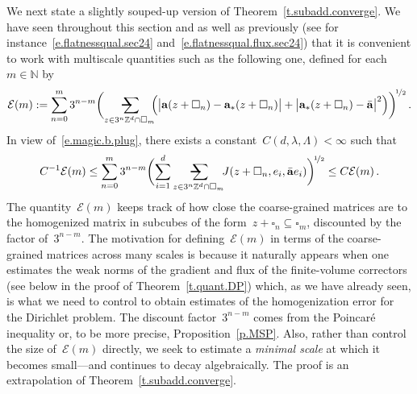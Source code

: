 \documentclass[11pt,twoside]{article} %
\makeatletter
\let\oldsquare\square %
\renewcommand{\square}{\oldsquare}
\numberwithin{equation}{section}
\theoremstyle{definition}
\newcommand*{\N}{\ensuremath{\mathbb{N}}}
\newcommand*{\Zd}{\ensuremath{\mathbb{Z}^d}}
\renewcommand{\a}{\mathbf{a}}
\newcommand{\ahom}{\bar{\a}}
\newcommand{\cu}{\square}
\newcommand{\avsum}{\mathop{\mathpalette\avsuminner\relax}\displaylimits}
\newcommand\avsuminner[2]{%
  {\sbox0{$\m@th#1\sum$}%
   \vphantom{\usebox0}%
   \ooalign{%
     \hidewidth
     \smash{\,\rule[.23em]{8.8pt}{1.1pt} \relax}%
     \hidewidth\cr
   ~$\m@th#1\sum$\cr
   }%
  }%
}
\makeatother
\begin{document}
We next state a slightly souped-up version of Theorem~\ref{t.subadd.converge}. 
We have seen throughout this section and as well as previously (see for instance~\eqref{e.flatnessqual.sec24} and~\eqref{e.flatnessqual.flux.sec24}) that it is convenient to work with multiscale quantities such as the following one, defined for each~$m\in\N$ by 
\begin{equation} 
\label{e.mcE.0}
\mathcal{E}(m) 
:=
\sum_{n=0}^{m}
3^{n-m} 
\biggl( 
\avsum_{z\in 3^n\Zd\cap \cu_m}
\!\!
\Bigl( \bigl| \a(z+\cu_n) - \a_*(z+\cu_n)  \bigr|
+
\bigl| \a_*(z+\cu_n) - \ahom \bigr|^2 \Bigr) 
\biggr)^{\!\nicefrac12} 
\,.
\end{equation}
In view of~\eqref{e.magic.b.plug}, there exists a constant~$C(d,\lambda,\Lambda)<\infty$ such that 
\begin{equation}
\label{e.J.by.mcE}
C^{-1} \mathcal{E} (m) 
\leq
\sum_{n=0}^{m}
3^{n-m} 
\biggl( 
\sum_{i=1}^d
\avsum_{z\in 3^n\Zd\cap \cu_m}
\!\!
J(z+\cu_n,e_i,\ahom e_i) 
\biggr)^{\!\nicefrac12} 
\leq C \mathcal{E} (m) 
\,.
\end{equation}
The quantity~$\mathcal{E}(m)$ keeps track of how close the coarse-grained matrices are to the homogenized matrix in subcubes of the form~$z+\cu_n \subseteq \cu_m$, discounted by the factor of~$3^{n-m}$.
The motivation for defining~$\mathcal{E}(m)$ in terms of the coarse-grained matrices across many scales is because it naturally appears when one estimates the weak norms of the gradient and flux of the finite-volume correctors (see below in the proof of Theorem~\ref{t.quant.DP}) which, as we have already seen, is what we need to control to obtain estimates of the homogenization error for the Dirichlet problem. The discount factor~$3^{n-m}$ comes from the Poincar\'e inequality or, to be more precise, Proposition~\ref{p.MSP}.  
Also, rather than control the size of~$\mathcal{E}(m)$ directly, we seek to estimate a \emph{minimal scale} at which it becomes small---and continues to decay algebraically.
The proof is an extrapolation of Theorem~\ref{t.subadd.converge}. 
\end{document}
